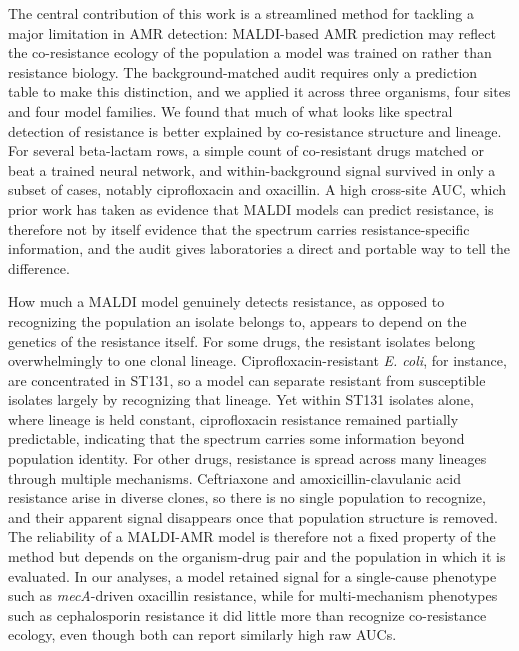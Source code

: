 \documentclass[11pt]{article}
\begin{document}
The central contribution of this work is a streamlined method for tackling a major limitation in AMR detection: MALDI-based AMR prediction may reflect the co-resistance ecology of the population a model was trained on rather than resistance biology. The background-matched audit requires only a prediction table to make this distinction, and we applied it across three organisms, four sites and four model families. We found that much of what looks like spectral detection of resistance is better explained by co-resistance structure and lineage. For several beta-lactam rows, a simple count of co-resistant drugs matched or beat a trained neural network, and within-background signal survived in only a subset of cases, notably ciprofloxacin and oxacillin. A high cross-site AUC, which prior work has taken as evidence that MALDI models can predict resistance, is therefore not by itself evidence that the spectrum carries resistance-specific information, and the audit gives laboratories a direct and portable way to tell the difference.

How much a MALDI model genuinely detects resistance, as opposed to recognizing the population an isolate belongs to, appears to depend on the genetics of the resistance itself. For some drugs, the resistant isolates belong overwhelmingly to one clonal lineage. Ciprofloxacin-resistant \textit{E. coli}, for instance, are concentrated in ST131, so a model can separate resistant from susceptible isolates largely by recognizing that lineage. Yet within ST131 isolates alone, where lineage is held constant, ciprofloxacin resistance remained partially predictable, indicating that the spectrum carries some information beyond population identity. For other drugs, resistance is spread across many lineages through multiple mechanisms. Ceftriaxone and amoxicillin-clavulanic acid resistance arise in diverse clones, so there is no single population to recognize, and their apparent signal disappears once that population structure is removed. The reliability of a MALDI-AMR model is therefore not a fixed property of the method but depends on the organism-drug pair and the population in which it is evaluated. In our analyses, a model retained signal for a single-cause phenotype such as \textit{mecA}-driven oxacillin resistance, while for multi-mechanism phenotypes such as cephalosporin resistance it did little more than recognize co-resistance ecology, even though both can report similarly high raw AUCs.
\end{document}
